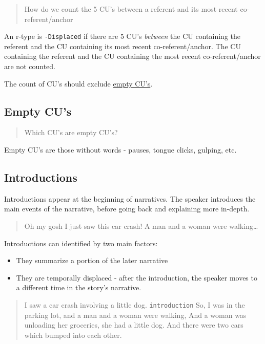 \documentclass[
]{book}
\providecommand{\tightlist}{%
  \setlength{\itemsep}{0pt}\setlength{\parskip}{0pt}}
\begin{document}
\begin{quote}
How do we count the 5 CU's between a referent and its most recent co-referent/anchor
\end{quote}

An r-type is \texttt{-Displaced} if there are 5 CU's \emph{between} the CU containing the referent and the CU containing its most recent co-referent/anchor.
The CU containing the referent and the CU containing the most recent co-referent/anchor are not counted.

The count of CU's should exclude \href{empty-cu's}{empty CU's}.

\hypertarget{empty-cus}{%
\subsection{Empty CU's}\label{empty-cus}}

\begin{quote}
Which CU's are empty CU's?
\end{quote}

Empty CU's are those without words - pauses, tongue clicks, gulping, etc.

\hypertarget{introductions}{%
\subsection{Introductions}\label{introductions}}

Introductions appear at the beginning of narratives.
The speaker introduces the main events of the narrative,
before going back and explaining more in-depth.

\begin{quote}
Oh my gosh I just saw this car crash!
A man and a woman were walking\ldots{}
\end{quote}

Introductions can identified by two main factors:

\begin{itemize}
\tightlist
\item
  They summarize a portion of the later narrative
\item
  They are temporally displaced - after the introduction,
  the speaker moves to a different time in the story's narrative.
\end{itemize}

\begin{quote}
I saw a car crash involving a little dog. \texttt{introduction}
So, I was in the parking lot, and a man and a woman were walking,
And a woman was unloading her groceries, she had a little dog.
And there were two cars which bumped into each other.
\end{quote}
\end{document}
